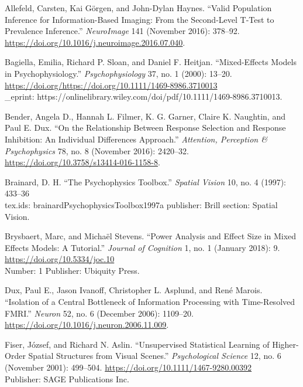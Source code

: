 \documentclass[
  12pt,
]{article}
\newlength{\cslhangindent}
\newenvironment{cslreferences}%
  {\setlength{\parindent}{0pt}%
  \everypar{\setlength{\hangindent}{\cslhangindent}}\ignorespaces}%
  {\par}
\begin{document}
\hypertarget{refs}{}
\begin{cslreferences}
\leavevmode\hypertarget{ref-allefeldValidPopulationInference2016}{}%
Allefeld, Carsten, Kai Görgen, and John-Dylan Haynes. ``Valid Population Inference for Information-Based Imaging: From the Second-Level T-Test to Prevalence Inference.'' \emph{NeuroImage} 141 (November 2016): 378--92. \url{https://doi.org/10.1016/j.neuroimage.2016.07.040}.

\leavevmode\hypertarget{ref-bagiellaMixedeffectsModelsPsychophysiology2000}{}%
Bagiella, Emilia, Richard P. Sloan, and Daniel F. Heitjan. ``Mixed-Effects Models in Psychophysiology.'' \emph{Psychophysiology} 37, no. 1 (2000): 13--20. \url{https://doi.org/https://doi.org/10.1111/1469-8986.3710013}\\
\_eprint: https://onlinelibrary.wiley.com/doi/pdf/10.1111/1469-8986.3710013.

\leavevmode\hypertarget{ref-benderRelationshipResponseSelection2016}{}%
Bender, Angela D., Hannah L. Filmer, K. G. Garner, Claire K. Naughtin, and Paul E. Dux. ``On the Relationship Between Response Selection and Response Inhibition: An Individual Differences Approach.'' \emph{Attention, Perception \& Psychophysics} 78, no. 8 (November 2016): 2420--32. \url{https://doi.org/10.3758/s13414-016-1158-8}.

\leavevmode\hypertarget{ref-brainardPsychophysicsToolbox1997}{}%
Brainard, D. H. ``The Psychophysics Toolbox.'' \emph{Spatial Vision} 10, no. 4 (1997): 433--36\\
tex.ids: brainardPsychophysicsToolbox1997a publisher: Brill section: Spatial Vision.

\leavevmode\hypertarget{ref-brysbaertPowerAnalysisEffect2018}{}%
Brysbaert, Marc, and Michaël Stevens. ``Power Analysis and Effect Size in Mixed Effects Models: A Tutorial.'' \emph{Journal of Cognition} 1, no. 1 (January 2018): 9. \url{https://doi.org/10.5334/joc.10}\\
Number: 1 Publisher: Ubiquity Press.

\leavevmode\hypertarget{ref-duxIsolationCentralBottleneck2006}{}%
Dux, Paul E., Jason Ivanoff, Christopher L. Asplund, and René Marois. ``Isolation of a Central Bottleneck of Information Processing with Time-Resolved FMRI.'' \emph{Neuron} 52, no. 6 (December 2006): 1109--20. \url{https://doi.org/10.1016/j.neuron.2006.11.009}.

\leavevmode\hypertarget{ref-fiserUnsupervisedStatisticalLearning2001}{}%
Fiser, József, and Richard N. Aslin. ``Unsupervised Statistical Learning of Higher-Order Spatial Structures from Visual Scenes.'' \emph{Psychological Science} 12, no. 6 (November 2001): 499--504. \url{https://doi.org/10.1111/1467-9280.00392}\\
Publisher: SAGE Publications Inc.


\end{cslreferences}
\end{document}
